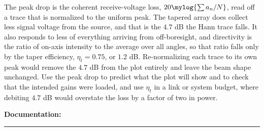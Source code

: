 \documentclass{exam}
\begin{document}
\begin{questions}
\begin{parts}
	\begin{solutionorlines}[2.6in]
	The peak drop is the coherent receive-voltage loss,
	$20\mylog{\sum a_n / N}$, read off a trace that is normalized to the uniform
	peak. The tapered array does collect less signal voltage from the source, and
	that is the $4.7$ dB the Hann trace falls. It also responds to less of
	everything arriving from off-boresight, and directivity is the ratio of
	on-axis intensity to the average over all angles, so that ratio falls only by
	the taper efficiency, $\eta_t = 0.75$, or $1.2$ dB. Re-normalizing each trace
	to its own peak would remove the $4.7$ dB from the plot entirely and leave the
	beam shape unchanged. Use the peak drop to predict what the plot will show and
	to check that the intended gains were loaded, and use $\eta_t$ in a link or
	system budget, where debiting $4.7$ dB would overstate the loss by a factor of
	two in power.
	\end{solutionorlines}

\end{parts}

\end{questions}

\vspace{1.0em}
\noindent\textbf{Documentation:} \rule[-2pt]{0.6\linewidth}{0.4pt}
\end{document}
